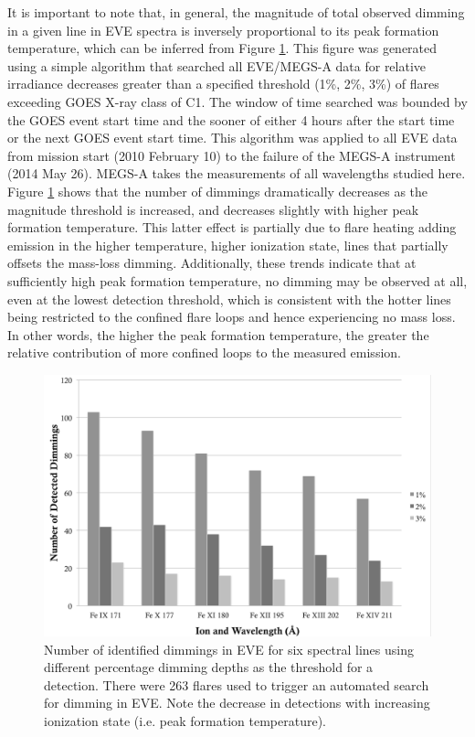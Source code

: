 It is important to note that, in general, the magnitude of total observed dimming in a given line in EVE spectra is inversely proportional to its peak formation temperature, which can be inferred from Figure \ref{detectedDimmingVsIonization}. This figure was generated using a simple algorithm that searched all EVE/MEGS-A data for relative irradiance decreases greater than a specified threshold (1\%, 2\%, 3\%) of flares exceeding GOES X-ray class of C1. The window of time searched was bounded by the GOES event start time and the sooner of either 4 hours after the start time or the next GOES event start time. This algorithm was applied to all EVE data from mission start (2010 February 10) to the failure of the MEGS-A instrument (2014 May 26). MEGS-A takes the measurements of all wavelengths studied here. Figure \ref{detectedDimmingVsIonization} shows that the number of dimmings dramatically decreases as the magnitude threshold is increased, and decreases slightly with higher peak formation temperature. This latter effect is partially due to flare heating adding emission in the higher temperature, higher ionization state, lines that partially offsets the mass-loss dimming. Additionally, these trends indicate that at sufficiently high peak formation temperature, no dimming may be observed at all, even at the lowest detection threshold, which is consistent with the hotter lines being restricted to the confined flare loops and hence experiencing no mass loss. In other words, the higher the peak formation temperature, the greater the relative contribution of more confined loops to the measured emission. 

\begin{figure}[!h]
    \caption[Dimming dependence on temperature in EVE]{
        Number of identified dimmings in EVE for six spectral lines using different percentage dimming depths as the
        threshold for a detection. There were 263 flares used to trigger an automated search for dimming in EVE. 
        Note the decrease in detections with increasing ionization state (i.e. peak formation temperature).
    }
    \begin{center}
        \includegraphics[width=150mm]{Images/DetectedDimmingVsIonization.png}
    \end{center}
    \label{detectedDimmingVsIonization}
\end{figure}

